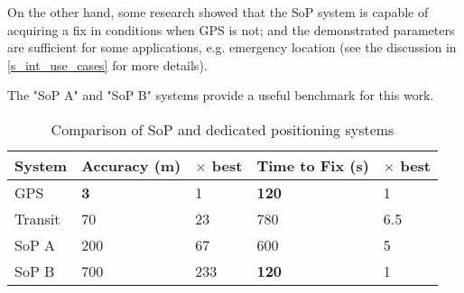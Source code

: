 On the other hand, some research showed that the SoP system is capable of acquiring a fix in conditions when GPS is not; and the demonstrated parameters are sufficient for some applications, e.g. emergency location (see the discussion in \autoref{s_int_use_cases} for more details).

The "SoP A" and "SoP B" systems provide a useful benchmark for this work.

\begin{table}
    \centering
    \begin{tabular}{l|ll|ll}
        System  & Accuracy (m) & $\times$ best & Time to Fix (s) &  $\times$ best \\ \hline
        GPS     & \textbf{3}   &             1 &    \textbf{120} & 1   \\
        Transit & 70           &            23 &             780 & 6.5 \\
        SoP A   & 200          &            67 &             600 & 5   \\
        SoP B   & 700          &           233 &    \textbf{120} & 1   \\
    \end{tabular}
    \caption{Comparison of SoP and dedicated positioning systems}
    \label{t_sop_comparison}
\end{table}

